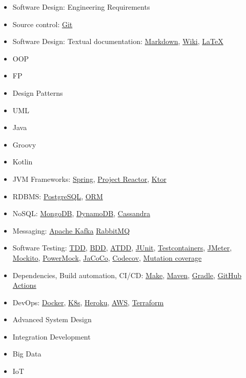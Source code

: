 \documentclass[nobrand,anonymous,nodate,nosecurity]{huawei}
\begin{document}
{\begin{itemize}
\item Software Design: Engineering Requirements
\item Source control:
	\href{https://git-scm.com}{Git}
\item Software Design: Textual documentation:
	\href{https://en.wikipedia.org/wiki/Markdown}{Markdown},
	\href{https://en.wikipedia.org/wiki/Wiki}{Wiki},
	\href{https://en.wikipedia.org/wiki/LaTeX}{LaTeX}
\item OOP
\item FP
\item Design Patterns
\item UML
\item Java
\item Groovy
\item Kotlin
\item JVM Frameworks:
	\href{https://spring.io}{Spring},
	\href{https://projectreactor.io}{Project Reactor},
	\href{https://ktor.io}{Ktor}
\item RDBMS:
	\href{https://www.postgresql.org.pl}{PostgreSQL},
	\href{https://www.wikiwand.com/en/Object%E2%80%93relational_mapping}{ORM}
\item NoSQL:
	\href{https://www.mongodb.com}{MongoDB},
	\href{https://aws.amazon.com/dynamodb/}{DynamoDB},
	\href{https://cassandra.apache.org/_/index.html}{Cassandra}
\item Messaging:
	\href{https://kafka.apache.org}{Apache Kafka}
	\href{https://www.rabbitmq.com}{RabbitMQ}
\item Software Testing:
	\href{}{TDD},
	\href{}{BDD},
	\href{}{ATDD},
	\href{https://junit.org/}{JUnit},
	\href{https://www.testcontainers.org}{Testcontainers},
	\href{https://jmeter.apache.org}{JMeter},
	\href{https://site.mockito.org}{Mockito},
	\href{https://github.com/powermock/powermock}{PowerMock},
	\href{https://www.eclemma.org/jacoco/}{JaCoCo},
	\href{codecov.io/}{Codecov},
	\href{}{Mutation coverage}
\item Dependencies, Build automation, CI/CD:
	\href{https://en.wikipedia.org/wiki/Make_(software)}{Make},
	\href{https://maven.apache.org}{Maven},
	\href{https://gradle.org}{Gradle},
	\href{https://gradle.org}{GitHub Actions}
\item DevOps:
	\href{https://www.docker.com}{Docker},
	\href{https://kubernetes.io}{K8s},
	\href{https://www.heroku.com}{Heroku},
	\href{https://aws.amazon.com/}{AWS},
	\href{https://www.terraform.io}{Terraform}
\item Advanced System Design
\item Integration Development
\item Big Data
\item IoT
\end{itemize}

}
\end{document}

